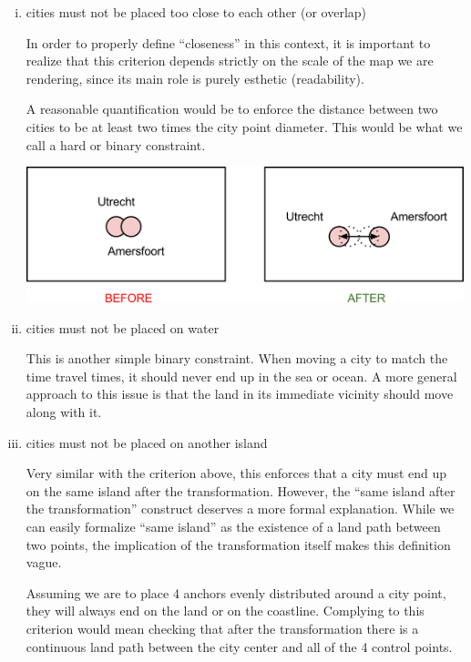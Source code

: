 \documentclass[a4paper,11pt]{article}
\begin{document}
\begin{enumerate}[(i)]
    \item cities must not be placed too close to each other (or
      overlap)

      In order to properly define ``closeness'' in this context, it is
      important to realize that this criterion depends strictly on the
      scale of the map we are rendering, since its main role is purely
      esthetic (readability).

      A reasonable quantification would be to enforce the distance
      between two cities to be at least two times the city point
      diameter. This would be what we call a hard or binary
      constraint.

    \begin{center}
        \includegraphics[width=\textwidth]{quant1.png}
    \end{center}
    
    \item cities must not be placed on water

      This is another simple binary constraint. When moving a city to
      match the time travel times, it should never end up in the sea
      or ocean. A more general approach to this issue is that the land
      in its immediate vicinity should move along with it.

    \item cities must not be placed on another island

      Very similar with the criterion above, this enforces that a city
      must end up on the same island after the
      transformation. However, the “same island after the
      transformation” construct deserves a more formal
      explanation. While we can easily formalize “same island” as the
      existence of a land path between two points, the implication of
      the transformation itself makes this definition vague.

      Assuming we are to place 4 anchors evenly distributed around a
      city point, they will always end on the land or on the
      coastline. Complying to this criterion would mean checking that
      after the transformation there is a continuous land path between
      the city center and all of the 4 control points.


\end{enumerate}
\end{document}
